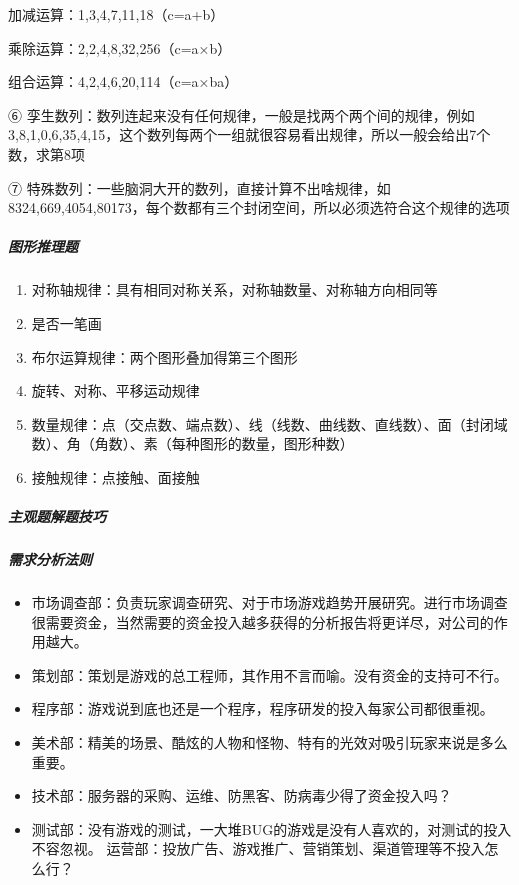 \documentclass[letterpaper,10pt,english]{sphinxmanual}
\begin{document}
加减运算：1,3,4,7,11,18（c=a+b）

乘除运算：2,2,4,8,32,256（c=a×b）

组合运算：4,2,4,6,20,114（c=a×b\sphinxhyphen{}a）

⑥
孪生数列：数列连起来没有任何规律，一般是找两个两个间的规律，例如3,8,1,0,6,35,4,15，这个数列每两个一组就很容易看出规律，所以一般会给出7个数，求第8项

⑦
特殊数列：一些脑洞大开的数列，直接计算不出啥规律，如8324,669,4054,80173，每个数都有三个封闭空间，所以必须选符合这个规律的选项


\subparagraph{图形推理题}
\label{\detokenize{chapter_interview/exam:id8}}\begin{enumerate}
%
\item {} 
对称轴规律：具有相同对称关系，对称轴数量、对称轴方向相同等

\item {} 
是否一笔画

\item {} 
布尔运算规律：两个图形叠加得第三个图形

\item {} 
旋转、对称、平移运动规律

\item {} 
数量规律：点（交点数、端点数）、线（线数、曲线数、直线数）、面（封闭域数）、角（角数）、素（每种图形的数量，图形种数）

\item {} 
接触规律：点接触、面接触

\end{enumerate}


\subparagraph{主观题解题技巧}
\label{\detokenize{chapter_interview/exam:id9}}

\subparagraph{需求分析法则}
\label{\detokenize{chapter_interview/exam:id10}}\begin{itemize}
\item {} 
市场调查部：负责玩家调查研究、对于市场游戏趋势开展研究。进行市场调查很需要资金，当然需要的资金投入越多获得的分析报告将更详尽，对公司的作用越大。

\item {} 
策划部：策划是游戏的总工程师，其作用不言而喻。没有资金的支持可不行。

\item {} 
程序部：游戏说到底也还是一个程序，程序研发的投入每家公司都很重视。

\item {} 
美术部：精美的场景、酷炫的人物和怪物、特有的光效对吸引玩家来说是多么重要。

\item {} 
技术部：服务器的采购、运维、防黑客、防病毒少得了资金投入吗？

\item {} 
测试部：没有游戏的测试，一大堆BUG的游戏是没有人喜欢的，对测试的投入不容忽视。
运营部：投放广告、游戏推广、营销策划、渠道管理等不投入怎么行？

\end{itemize}
\end{document}
